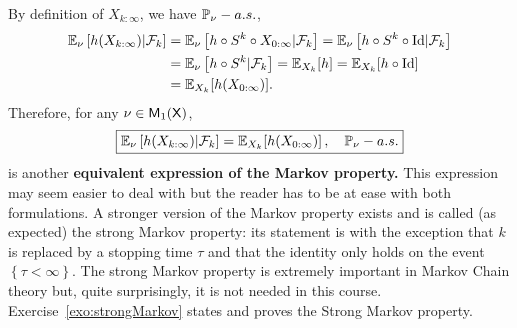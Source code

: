 \documentclass[english,graybox,envcountchap,envcountsame,sectrefs,shortlabels]{svmono}
\theoremstyle{style}
\begin{document}
By definition of $X_{k:\infty}$, we have $\mathbb{P}_{\nu}-a.s.$,
\begin{align*}
\mathbb{E}_{\nu}\left[h(X_{k:\infty})|\mathcal{F}_{k}\right] & =\mathbb{E}_{\nu}\left[h\circ S^{k}\circ X_{0:\infty}|\mathcal{F}_{k}\right]=\mathbb{E}_{\nu}\left[h\circ S^{k}\circ \mathrm{Id}|\mathcal{F}_{k}\right]\\
 & =\mathbb{E}_{\nu}\left[h\circ S^{k}|\mathcal{F}_{k}\right]=\mathbb{E}_{X_{k}}[h]=\mathbb{E}_{X_{k}}[h\circ \mathrm{Id}]\\
 & =\mathbb{E}_{X_{k}}[h(X_{0:\infty})].
\end{align*}
 Therefore, for any $\nu\in\mathsf{M}_{1}(\mathsf{X})$,
\[
\boxed{\mathbb{E}_{\nu}\left[h(X_{k:\infty})|\mathcal{F}_{k}\right]=\mathbb{E}_{X_{k}}[h(X_{0:\infty})]\,,\quad\mathbb{P}_{\nu}-a.s.}
\]
 is another \textbf{equivalent expression of the Markov property.
}This expression may seem easier to deal with but the reader has to
be at ease with both formulations. A stronger version of the Markov
property exists and is called (as expected) the strong Markov property:
its statement is  with the exception that $k$
is replaced by a stopping time $\tau$ and that the identity only
holds on the event $\left\{ \tau<\infty\right\} $. The strong Markov
property is extremely important in Markov Chain theory but, quite
surprisingly, it is not needed in this course.  Exercise~\ref{exo:strongMarkov} states and proves the Strong Markov property.

%
\end{document}
